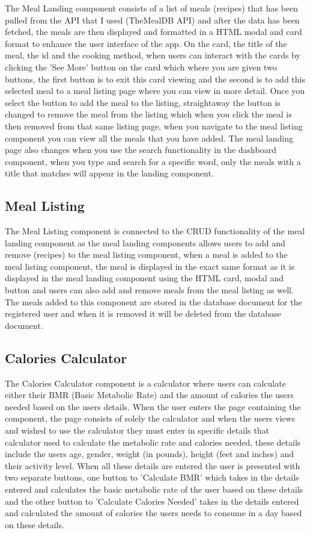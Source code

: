 The Meal Landing component consists of a list of meals (recipes) that has been pulled from the API that I used (TheMealDB API) and after the data has been fetched, the meals are then displayed and formatted in a HTML modal and card format to enhance the user interface of the app. On the card, the title of the meal, the id and the cooking method, when users can interact with the cards by clicking the 'See More' button on the card which where you are given two buttons, the first button is to exit this card viewing and the second is to add this selected meal to a meal listing page where you can view in more detail. Once you select the button to add the meal to the listing, straightaway the button is changed to remove the meal from the listing which when you click the meal is then removed from that same listing page, when you navigate to the meal listing component you can view all the meals that you have added. The meal landing page also changes when you use the search functionality in the dashboard component, when you type and search for a specific word, only the meals with a title that matches will appear in the landing component.

\subsection{Meal Listing}

The Meal Listing component is connected to the CRUD functionality of the meal landing component as the meal landing components allows users to add and remove (recipes) to the meal listing component, when a meal is added to the meal listing component, the meal is displayed in the exact same format as it is displayed in the meal landing component using the HTML card, modal and button and users can also add and remove meals from the meal listing as well. The meals added to this component are stored in the database document for the registered user and when it is removed it will be deleted from the database document.

\subsection{Calories Calculator}

The Calories Calculator component is a calculator where users can calculate either their BMR (Basic Metabolic Rate) and the amount of calories the users needed based on the users details. When the user enters the page containing the component, the page consists of solely the calculator and when the users views and wished to use the calculator they must enter in specific details that calculator used to calculate the metabolic rate and calories needed, these details include the users age, gender, weight (in pounds), height (feet and inches) and their activity level. When all these details are entered the user is presented with two separate buttons, one button to 'Calculate BMR' which takes in the details entered and calculates the basic metabolic rate of the user based on these details and the other button to 'Calculate Calories Needed' takes in the details entered and calculated the amount of calories the users needs to consume in a day based on these details.

